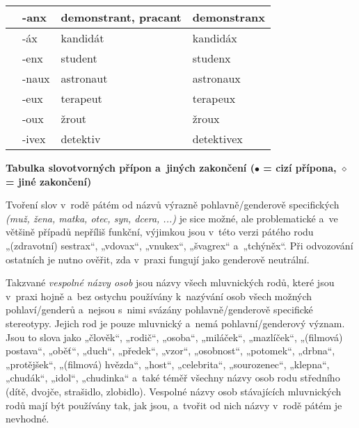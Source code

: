 \begin{table}
{\begin{longtabu}{|X[1,R]|X[1,R]|X[3,L]|X[3,L]|}
&-anx   &demonstrant, pracant   &demonstranx\\\hline%
&-áx    &kandidát           &kandidáx\\\hline%
&-enx   &student            &studenx\\\hline%
&-naux    &astronaut&astronaux\\\hline%
&-eux     &terapeut&terapeux\\\hline%
&-oux   &žrout              &žroux\\\hline%
&-ivex  &detektiv&detektivex\\\hline%
\end{longtabu}}
\begin{center}\bfseries Tabulka slovotvorných přípon a jiných zakončení ($\bullet$ = cizí přípona, $\diamond$ = jiné zakončení)\end{center}
\end{table}

Tvoření slov v rodě pátém od názvů výrazně pohlavně/genderově
specifických \emph{(muž, žena, matka, otec, syn, dcera, ...)}
je sice možné, ale problematické a ve většině případů nepříliš funkční,
výjimkou jsou v této verzi pátého rodu „(zdravotní) sestrax“, „vdovax“, „vnukex“,
„švagrex“ a „tchýněx“.
Při odvozování ostatních je nutno ověřit, zda v praxi fungují jako genderově
neutrální.

Takzvané \emph{vespolné názvy osob} jsou názvy všech mluvnických rodů,
které jsou v praxi hojně a bez ostychu používány
k nazývání osob všech možných pohlaví/genderů a nejsou s nimi svázány
pohlavně/genderově specifické stereotypy. Jejich rod je pouze mluvnický
a nemá pohlavní/genderový význam. Jsou to slova jako
„člověk“, „rodič“, „osoba“, „miláček“, „mazlíček“, „(filmová) postava“,
„oběť“, „duch“, „předek“, „vzor“, „osobnost“, „potomek“, „drbna“, „protějšek“,
„(filmová) hvězda“, „host“, „celebrita“, „sourozenec“, „klepna“, „chudák“,
„idol“, „chudinka“
a také téměř všechny názvy osob rodu středního (dítě, dvojče, strašidlo,
zlobidlo). Vespolné názvy osob stávajících mluvnických rodů mají být používány tak,
jak jsou, a tvořit od nich názvy v rodě pátém je nevhodné.


